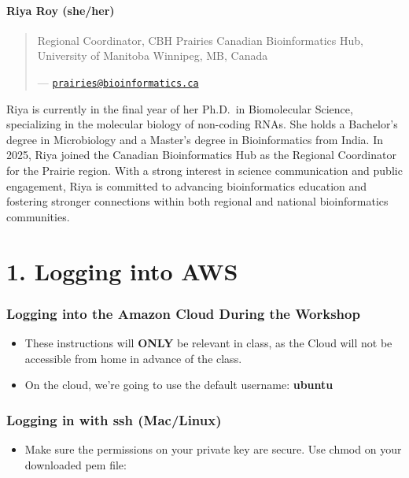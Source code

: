 \documentclass[
]{book}
\providecommand{\tightlist}{%
  \setlength{\itemsep}{0pt}\setlength{\parskip}{0pt}}
\begin{document}
\subsubsection{Riya Roy (she/her)}\label{riya-roy-sheher}

\begin{quote}
Regional Coordinator, CBH Prairies
Canadian Bioinformatics Hub, University of Manitoba
Winnipeg, MB, Canada

--- \href{mailto:prairies@bioinformatics.ca}{\nolinkurl{prairies@bioinformatics.ca}}
\end{quote}

Riya is currently in the final year of her Ph.D.~in Biomolecular Science, specializing in the molecular biology of non-coding RNAs. She holds a Bachelor's degree in Microbiology and a Master's degree in Bioinformatics from India. In 2025, Riya joined the Canadian Bioinformatics Hub as the Regional Coordinator for the Prairie region. With a strong interest in science communication and public engagement, Riya is committed to advancing bioinformatics education and fostering stronger connections within both regional and national bioinformatics communities.

\chapter{1. Logging into AWS}\label{logging-into-aws}

\subsection{Logging into the Amazon Cloud During the Workshop}\label{logging-into-the-amazon-cloud-during-the-workshop}

\begin{itemize}
\item
  These instructions will \textbf{ONLY} be relevant in class, as the Cloud will not be accessible from home in advance of the class.
\item
  On the cloud, we're going to use the default username: \textbf{ubuntu}
\end{itemize}

\subsection{Logging in with ssh (Mac/Linux)}\label{logging-in-with-ssh-maclinux}

\begin{itemize}
\tightlist
\item
  Make sure the permissions on your private key are secure. Use chmod on your downloaded pem file:
\end{itemize}
\end{document}
